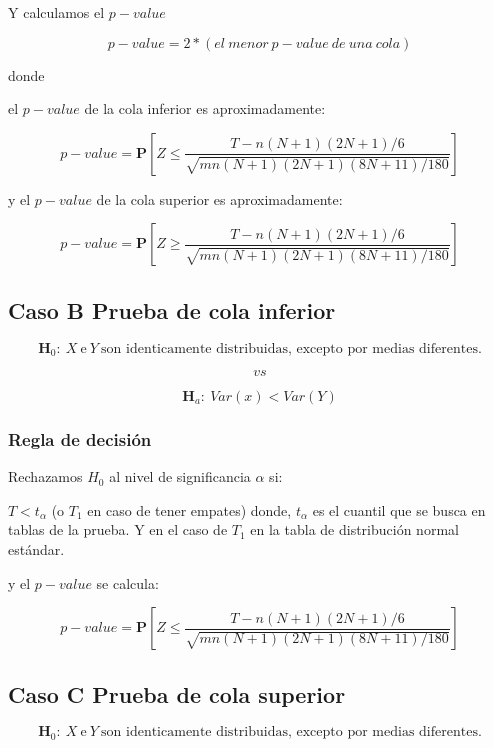 \documentclass[
  a4paper,
  oneside,
  openany]{book}
\begin{document}
Y calculamos el \(p-value\)

\[p-value= 2*(el \ menor\ p-value\ de\ una\ cola)\]

donde

el \(p-value\) de la cola inferior es aproximadamente:

\[ p-value=\mathbf{P}\left[Z\leq\frac{T-n(N+1)(2N+1)/6}{\sqrt{mn(N+1)(2N+1)(8N+11)/180}}\right]\]

y el \(p-value\) de la cola superior es aproximadamente:

\[p-value=\mathbf{P}\left[Z\geq\frac{T-n(N+1)(2N+1)/6}{\sqrt{mn(N+1)(2N+1)(8N+11)/180}}\right]\]

\hypertarget{caso-b-prueba-de-cola-inferior-5}{%
\subsection*{Caso B Prueba de cola inferior}\label{caso-b-prueba-de-cola-inferior-5}}


\[\textbf{H}_0: \ X \  \mbox{e} \  Y \ \mbox{son identicamente distribuidas, excepto por medias diferentes.}\]

\[vs\]

\[\textbf{H}_a: \ Var(x) < Var(Y)\]

\hypertarget{regla-de-decisiuxf3n-18}{%
\subsubsection*{Regla de decisión}\label{regla-de-decisiuxf3n-18}}


Rechazamos \(H_0\) al nivel de significancia \(\alpha\) si:

\(T<t_\alpha\) (o \(T_1\) en caso de tener empates) donde, \(t_\alpha\) es el cuantil que se busca en tablas de la prueba. Y en el caso de \(T_{1}\) en la tabla de distribución normal estándar.

y el \(p-value\) se calcula:

\[ p-value= \mathbf{P}\left[Z\leq\frac{T-n(N+1)(2N+1)/6}{\sqrt{mn(N+1)(2N+1)(8N+11)/180}}\right]\]

\hypertarget{caso-c-prueba-de-cola-superior-4}{%
\subsection*{Caso C Prueba de cola superior}\label{caso-c-prueba-de-cola-superior-4}}


\[\textbf{H}_0: \ X \  \mbox{e} \  Y \ \mbox{son identicamente distribuidas, excepto por medias diferentes.}\]
\end{document}
